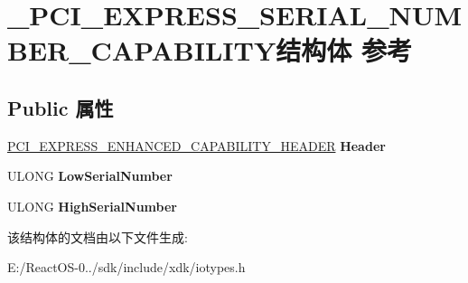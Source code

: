\hypertarget{struct___p_c_i___e_x_p_r_e_s_s___s_e_r_i_a_l___n_u_m_b_e_r___c_a_p_a_b_i_l_i_t_y}{}\section{\+\_\+\+P\+C\+I\+\_\+\+E\+X\+P\+R\+E\+S\+S\+\_\+\+S\+E\+R\+I\+A\+L\+\_\+\+N\+U\+M\+B\+E\+R\+\_\+\+C\+A\+P\+A\+B\+I\+L\+I\+T\+Y结构体 参考}
\label{struct___p_c_i___e_x_p_r_e_s_s___s_e_r_i_a_l___n_u_m_b_e_r___c_a_p_a_b_i_l_i_t_y}
\subsection*{Public 属性}
\begin{DoxyCompactItemize}
\item 
\mbox{\label{struct___p_c_i___e_x_p_r_e_s_s___s_e_r_i_a_l___n_u_m_b_e_r___c_a_p_a_b_i_l_i_t_y_ad3e9dcb796d9bfe6257ccde01a52ec0b}} 
\hyperlink{struct___p_c_i___e_x_p_r_e_s_s___e_n_h_a_n_c_e_d___c_a_p_a_b_i_l_i_t_y___h_e_a_d_e_r}{P\+C\+I\+\_\+\+E\+X\+P\+R\+E\+S\+S\+\_\+\+E\+N\+H\+A\+N\+C\+E\+D\+\_\+\+C\+A\+P\+A\+B\+I\+L\+I\+T\+Y\+\_\+\+H\+E\+A\+D\+ER} {\bfseries Header}
\item 
\mbox{\label{struct___p_c_i___e_x_p_r_e_s_s___s_e_r_i_a_l___n_u_m_b_e_r___c_a_p_a_b_i_l_i_t_y_a7d8bcd84faa2c6ff0325652b27254baa}} 
U\+L\+O\+NG {\bfseries Low\+Serial\+Number}
\item 
\mbox{\label{struct___p_c_i___e_x_p_r_e_s_s___s_e_r_i_a_l___n_u_m_b_e_r___c_a_p_a_b_i_l_i_t_y_a0dac6c5cb2473b210f42185da7f7c1aa}} 
U\+L\+O\+NG {\bfseries High\+Serial\+Number}
\end{DoxyCompactItemize}


该结构体的文档由以下文件生成\+:\begin{DoxyCompactItemize}
\item 
E\+:/\+React\+O\+S-\/0../sdk/include/xdk/iotypes.\+h\end{DoxyCompactItemize}
